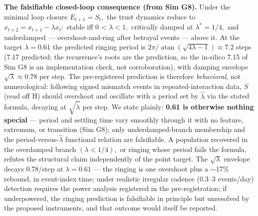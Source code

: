 \documentclass[11pt,twocolumn]{article}
\DeclareMathOperator{\atan}{atan}
\theoremstyle{gttdef}
\theoremstyle{gttplain}
\begin{document}
\textbf{The falsifiable closed-loop consequence (from Sim G8).} Under the minimal loop closure $E_{t+1} = S_t,$ the trust dynamics reduce to $x_{t+2} = x_{t+1} - \lambda x_t:$ stable iff 0 < $\lambda < 1,$ critically damped at $\lambda^{*} = 1/4,$ and underdamped --- overshoot-and-ring after betrayal events --- above it. At the target $\lambda = 0.61$ the predicted ringing period is $2\pi/\atan(\sqrt{4\lambda-1}) \approx 7.2$ steps (7.17 predicted; the recurrence's roots are the prediction, so the in-silico 7.15 of Sim G8 is an implementation check, not corroboration), with damping envelope $\sqrt{\lambda} \approx 0.78$ per step. The pre-registered prediction is therefore \emph{behavioral}, not numerological: following signed mismatch events in repeated-interaction data, $S$ (read off H) should overshoot and oscillate with a period set by $\hat{\lambda}$ via the stated formula, decaying at $\sqrt{\hat{\lambda}}$ per step. We state plainly: \textbf{0.61 is otherwise nothing special} --- period and settling time vary smoothly through it with no feature, extremum, or transition (Sim G8); only underdamped-branch membership and the period-versus-$\hat{\lambda}$ functional relation are falsifiable. A population recovered in the overdamped branch $(\lambda < 1/4),$ or ringing whose period fails the formula, refutes the structural claim independently of the point target. The $\sqrt{\lambda}$ envelope decays 0.78/step at $\lambda = 0.61$ --- the ringing is one overshoot plus a $\sim$17\% rebound, in event-index time; under realistic irregular cadence (0.3--3 events/day) detection requires the power analysis registered in the pre-registration; if underpowered, the ringing prediction is falsifiable in principle but unresolved by the proposed instruments, and that outcome would itself be reported.
\end{document}
